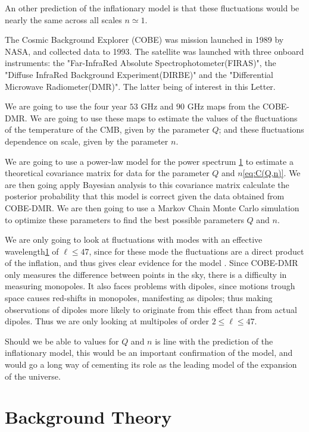 \documentclass{emulateapj}
\begin{document}
An other prediction of the inflationary model is that these fluctuations would be nearly the same across all scales $n\simeq1$\citep{zeldovich}. 

The Cosmic Background Explorer (COBE) was mission launched in 1989 by NASA, and collected data to 1993. The satellite was launched with three onboard instruments: the "Far-InfraRed Absolute Spectrophotometer(FIRAS)", the "Diffuse InfraRed Background Experiment(DIRBE)" and the "Differential Microwave Radiometer(DMR)". The latter being of interest in this Letter.

We are going to use the four year $53$ GHz and $90$ GHz maps from the COBE-DMR. We are going to use these maps to estimate the values of the fluctuations of the temperature of the CMB, given by the parameter $Q$; and these fluctuations dependence on scale, given by the parameter $n$.

We are going to use a power-law model for the power spectrum \ref{sec:theory} to estimate a theoretical covariance matrix for data for the parameter $Q$ and $n$\eqref{eq:C(Q,n)}. We are then going apply Bayesian analysis to this covariance matrix calculate the posterior probability that this model is correct given the data obtained from COBE-DMR. We are then going to use a Markov Chain Monte Carlo simulation to optimize these parameters to find the best possible parameters $Q$ and $n$. 

We are only going to look at fluctuations with modes with an effective wavelength\ref{sec:theory} of $\ell \leq 47$, since for these mode the fluctuations are a direct product of the inflation, and thus gives clear evidence for the model \citep{HKforelesning}. Since COBE-DMR only measures the difference between points in the sky, there is a difficulty in measuring monopoles. It also faces problems with dipoles, since motions trough space causes red-shifts in monopoles, manifesting as dipoles; thus making observations of dipoles more likely to originate from this effect than from actual dipoles. Thus we are only looking at multipoles of order $2 \leq \ell \leq 47$.

Should we be able to values for $Q$ and $n$ is line with the prediction of the inflationary model, this would be an important confirmation of the model, and would go a long way of cementing its role as the leading model of the expansion of the universe.


\section{Background Theory}
\label{sec:theory}
\end{document}
